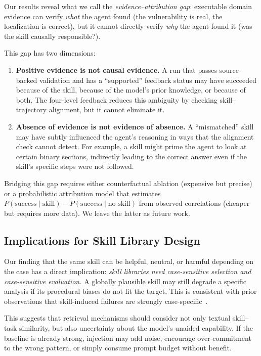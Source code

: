 ﻿\documentclass[preprint,12pt]{elsarticle}
\begin{document}
Our results reveal what we call the \emph{evidence--attribution gap}:
executable domain evidence can verify \emph{what} the agent found (the
vulnerability is real, the localization is correct), but it cannot
directly verify \emph{why} the agent found it (was the skill causally
responsible?).

This gap has two dimensions:
\begin{enumerate}[leftmargin=*]
    \item \textbf{Positive evidence is not causal evidence.} A run that
    passes source-backed validation and has a ``supported'' feedback status
    may have succeeded because of the skill, because of the model's prior
    knowledge, or because of both.  The four-level feedback reduces this
    ambiguity by checking skill--trajectory alignment, but it cannot
    eliminate it.
    \item \textbf{Absence of evidence is not evidence of absence.} A
    ``mismatched'' skill may have subtly influenced the agent's reasoning
    in ways that the alignment check cannot detect.  For example, a skill
    might prime the agent to look at certain binary sections, indirectly
    leading to the correct answer even if the skill's specific steps were
    not followed.
\end{enumerate}

Bridging this gap requires either counterfactual ablation (expensive but
precise) or a probabilistic attribution model that estimates $P(\text{success}
\mid \text{skill}) - P(\text{success} \mid \text{no skill})$ from observed
correlations (cheaper but requires more data).  We leave the latter as
future work.

\subsection{Implications for Skill Library Design}

Our finding that the same skill can be helpful, neutral, or harmful
depending on the case has a direct implication: \emph{skill libraries need
case-sensitive selection and case-sensitive evaluation.}  A globally
plausible skill may still degrade a specific analysis if its procedural
biases do not fit the target.  This is consistent with
prior observations that skill-induced failures are strongly
case-specific~\cite{skillharmful}.

This suggests that retrieval mechanisms should consider not only textual
skill--task similarity, but also uncertainty about the model's unaided
capability.  If the baseline is already strong, injection may add noise,
encourage over-commitment to the wrong pattern, or simply consume prompt
budget without benefit.
\end{document}

